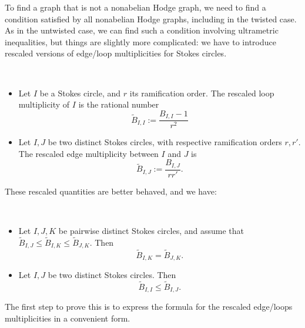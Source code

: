 \documentclass[11pt,a4paper]{amsart}
\numberwithin{equation}{section}
\begin{document}
To find a graph that is not a nonabelian Hodge graph, we need to find a condition satisfied by all nonabelian Hodge graphs, including in the twisted case. As in the untwisted case, we can find such a condition involving ultrametric inequalities, but things are slightly more complicated: we have to introduce rescaled versions of edge/loop multiplicities for Stokes circles.

\begin{definition}~
\begin{itemize}
\item 
Let $I$ be a Stokes circle, and $r$ its ramification order. The rescaled loop multiplicity of $I$ is the rational number
\begin{equation}
\widetilde B_{I,I}:=\frac{B_{I,I}-1}{r^2}
\end{equation}
\item Let $I,J$ be two distinct Stokes circles, with respective ramification orders $r,r'$. The rescaled edge multiplicity between $I$ and $J$ is 
\begin{equation}
\widetilde B_{I,J}:=\frac{B_{I,J}}{rr'}.
\end{equation} 
\end{itemize}
\end{definition}

These rescaled quantities are better behaved, and we have:

\begin{theorem}~
\label{thm:necessary_condition_diagram}
\begin{itemize}
\item Let $I,J,K$ be pairwise distinct Stokes circles, and assume that $\widetilde B_{I,J}\leq \widetilde B_{I,K}\leq \widetilde B_{J,K}$. Then 
\begin{equation}
\widetilde B_{I,K}=\widetilde B_{J,K}. 
\end{equation}
\item Let $I,J$ be two distinct Stokes circles. Then
\begin{equation}
\widetilde B_{I,I}\leq \widetilde B_{I,J}. 
\end{equation}
\end{itemize}
\end{theorem}

The first step to prove this is to express the formula for the rescaled edge/loops multiplicities in a convenient form.
\end{document}
